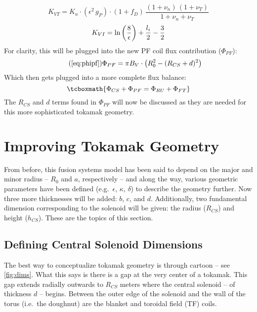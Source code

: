 \begin{equation}
	K_{VT} = K_{n} \cdot ( \epsilon ^ 2 \, g_P ) \cdot ( 1 + f_D ) \, \frac{ (1 + \nu_n) \, (1 + \nu_T) }{1 + \nu_n + \nu_T }
\end{equation}
\begin{equation}
	K_{VI} = \textnormal{ln} \left(\frac{8}{\epsilon}\right) + \frac{l_i}{2} - \frac{3}{2}
\end{equation}
For clarity, this will be plugged into the new PF coil flux contribution ($\Phi_{PF}$):
\begin{equation}
	\tag{\ref{eq:phipf}}
	\Phi_{PF} = \pi B_V \cdot \left( R_0^2 - ( R_{CS} + d ) ^ 2 \right)
\end{equation}
Which then gets plugged into a more complete flux balance:
\begin{equation}
	\label{eq:full_ibal}
	\tcboxmath{
		\Phi_{CS} + \Phi_{PF} = \Phi_{RU} + \Phi_{FT}
	}
\end{equation}
The $R_{CS}$ and $d$ terms found in $\Phi_{PF}$ will now be discussed as they are needed for this more sophisticated tokamak geometry.

\section{Improving Tokamak Geometry}

From before, this fusion systems model has been said to depend on the major and minor radius -- $R_0$ and $a$, respectively -- and along the way, various geometric parameters have been defined (e.g.\ $\epsilon$, $\kappa$, $\delta$) to describe the geometry further. Now three more thicknesses will be added: $b$, $c$, and $d$. Additionally, two fundamental dimension corresponding to the solenoid will be given: the radius ($R_{CS}$) and height ($h_{CS}$). These are the topics of this section.

\subsection{Defining Central Solenoid Dimensions}

The best way to conceptualize tokamak geometry is through cartoon -- see \cref{fig:dims}. What this says is there is a gap at the very center of a tokamak. This gap extends radially outwards to $R_{CS}$ meters where the  central solenoid -- of thickness $d$ -- begins. Between the outer edge of the solenoid and the wall of the torus (i.e.\ the doughnut) are the blanket and toroidal field (TF) coils.

